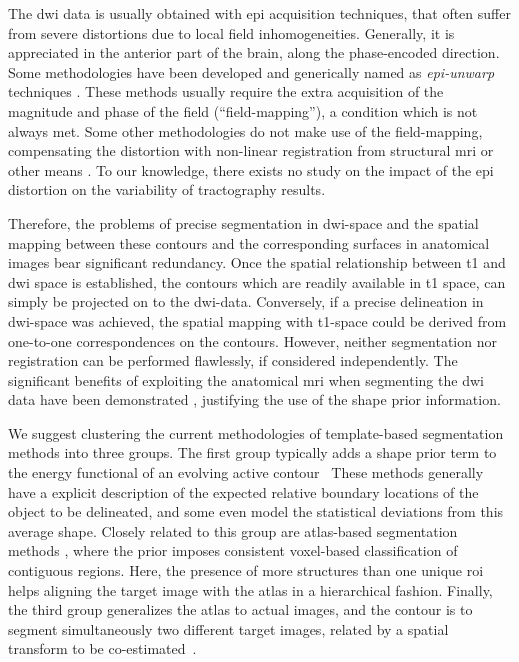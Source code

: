 The \ac{dwi} data is usually obtained with \ac{epi}
acquisition techniques, that often suffer from severe distortions due to 
local field inhomogeneities. Generally, it is appreciated in the anterior
part of the brain, along the phase-encoded direction. Some methodologies have
been developed and generically named as \emph{\ac{epi}-unwarp} techniques
\cite{holland_efficient_2010,hsu_correction_2009,jezzard_characterization_2005,
reber_correction_2005}. These methods usually 
require the extra acquisition of the magnitude and phase of
the field (``field-mapping''), a condition which is not always met. Some other 
methodologies do not make use of the field-mapping, compensating the distortion
with non-linear registration from structural \ac{mri} or other means
\citep{andersson_modeling_2001}. To our knowledge, there exists no study
on the impact of the \ac{epi} distortion on the variability of tractography
results. 

Therefore, the problems of precise segmentation in \ac{dwi}-space and the 
spatial mapping between these contours and the corresponding surfaces in 
anatomical images bear significant redundancy. Once the spatial relationship 
between \ac{t1} and \ac{dwi} space is established, the contours which are 
readily available in \ac{t1} space, can simply be projected on to the 
\ac{dwi}-data. Conversely, if a precise delineation in \ac{dwi}-space 
was achieved, the spatial mapping with \ac{t1}-space could be derived 
from one-to-one correspondences on the contours. However, neither segmentation 
nor registration can be performed flawlessly, if considered independently. 
The significant benefits of exploiting the anatomical \ac{mri} when 
segmenting the \ac{dwi} data have been demonstrated \cite{zollei_improved_2010}, 
justifying the use of the shape prior information. 

We suggest clustering the current methodologies of template-based segmentation 
methods into three groups. The first group typically adds a shape prior term to 
the energy functional of an evolving active contour~\citep{Chen2002,
Paragios2003,Vemuri2003a,Yezzi2003a,Gastaud2004,Chan2005,Cremers2006,Bresson2006a} %
These methods generally have a explicit description of the expected relative boundary 
locations of the object to be delineated, and some even model the statistical deviations
from this average shape. Closely related to this group are atlas-based segmentation
methods \citep{Pohl2005,Pohl2006,Wang2006,Gorthi2009,Gorthi2011}, where the prior 
imposes consistent voxel-based classification of contiguous regions. Here, the 
presence of more structures than one unique \ac{roi} helps aligning the target image 
with the atlas in a hierarchical fashion. Finally, the third group generalizes 
the atlas to actual images, and the contour is to segment simultaneously two 
different target images, related by a spatial transform to be co-estimated~\citep{Wyatt2003,
Yezzi2003}.

